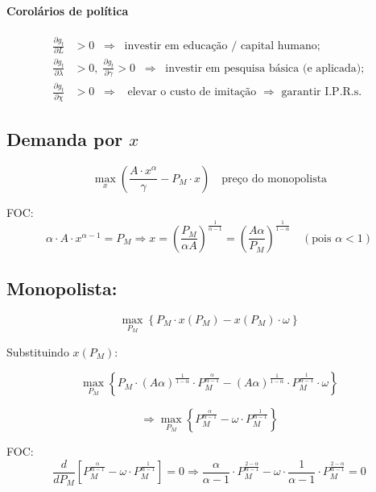 \documentclass[a4paper,12pt]{article}[abntex2]
\begin{document}
\paragraph{\textbf{Corolários de política}}
\begin{align*}
\frac{\partial g_t}{\partial L} &> 0
\;\;\Longrightarrow\;\; \text{investir em educação / capital humano};\\[2pt]
\frac{\partial g_t}{\partial\lambda} &> 0,\;
\frac{\partial g_t}{\partial\gamma} > 0
\;\;\Longrightarrow\;\; \text{investir em pesquisa básica (e aplicada)};\\[2pt]
\frac{\partial g_t}{\partial \chi} &> 0
\;\;\Longrightarrow\;\; \text{elevar o custo de imitação $\;\Rightarrow\;$ garantir I.P.R.s.}
\end{align*}

\subsection{\textbf{Demanda por \(x\)}}

\[
\max_x \left( \frac{A \cdot x^\alpha}{\gamma} - P_M \cdot x \right) 
\quad \text{preço do monopolista}
\]

FOC:
\[
\alpha \cdot A \cdot x^{\alpha - 1} = P_M
\Rightarrow
x = \left( \frac{P_M}{\alpha A} \right)^{\frac{1}{\alpha - 1}}
= \left( \frac{A \alpha}{P_M} \right)^{\frac{1}{1 - \alpha}} \quad (\text{pois } \alpha < 1)
\]

\subsection{\textbf{Monopolista}:}

\[
\max_{P_M} \left\{ P_M \cdot x(P_M) - x(P_M) \cdot \omega \right\}
\]

Substituindo \(x(P_M)\):

\[
\max_{P_M} \left\{
P_M \cdot \left( A \alpha \right)^{\frac{1}{1 - \alpha}} \cdot P_M^{\frac{\alpha}{\alpha - 1}}
-
\left( A \alpha \right)^{\frac{1}{1 - \alpha}} \cdot P_M^{\frac{1}{\alpha - 1}} \cdot \omega
\right\}
\]

\[
\Rightarrow \max_{P_M} \left\{
P_M^{\frac{\alpha}{\alpha - 1}} - \omega \cdot P_M^{\frac{1}{\alpha - 1}}
\right\}
\]

FOC:
\[
\frac{d}{dP_M} \left[
P_M^{\frac{\alpha}{\alpha - 1}} - \omega \cdot P_M^{\frac{1}{\alpha - 1}}
\right] = 0
\Rightarrow
\frac{\alpha}{\alpha - 1} \cdot P_M^{\frac{2 - \alpha}{\alpha - 1}}
-
\omega \cdot \frac{1}{\alpha - 1} \cdot P_M^{\frac{2 - \alpha}{\alpha - 1}} = 0
\]
\end{document}
